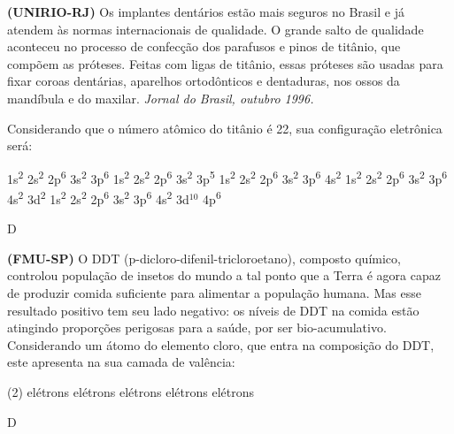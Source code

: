 \documentclass[9 pt]{scrartcl}
\def\PQ{0.84} %
\begin{document}
\begin{exercise}[points=\PQ]
\textbf{(UNIRIO-RJ)} Os implantes dentários estão mais seguros no Brasil e já atendem às normas internacionais de qualidade. O grande salto de qualidade aconteceu no processo de confecção dos parafusos e pinos de titânio, que compõem as próteses. Feitas com ligas de titânio, essas próteses são usadas para fixar coroas dentárias, aparelhos ortodônticos e dentaduras, nos ossos da mandíbula e do maxilar.
\emph{Jornal do Brasil, outubro 1996.}

Considerando que o número atômico do titânio é 22, sua configuração eletrônica será:

\begin{choice}
\choice 1s\textsuperscript{2} 2s\textsuperscript{2} 2p\textsuperscript{6} 3s\textsuperscript{2} 3p\textsuperscript{6}
\choice 1s\textsuperscript{2} 2s\textsuperscript{2} 2p\textsuperscript{6} 3s\textsuperscript{2} 3p\textsuperscript{5}
\choice 1s\textsuperscript{2} 2s\textsuperscript{2} 2p\textsuperscript{6} 3s\textsuperscript{2} 3p\textsuperscript{6} 4s\textsuperscript{2}
\choice 1s\textsuperscript{2} 2s\textsuperscript{2} 2p\textsuperscript{6} 3s\textsuperscript{2} 3p\textsuperscript{6} 4s\textsuperscript{2} 3d\textsuperscript{2}
\choice 1s\textsuperscript{2} 2s\textsuperscript{2} 2p\textsuperscript{6} 3s\textsuperscript{2} 3p\textsuperscript{6} 4s\textsuperscript{2} 3d$^{10}$ 4p\textsuperscript{6}
\end{choice}
\end{exercise}
\begin{solution}
D
\end{solution}

\begin{exercise}[points=\PQ]
\textbf{(FMU-SP)} O DDT (p-dicloro-difenil-tricloroetano), composto químico, controlou  população de insetos do mundo a tal ponto que a Terra é agora capaz de produzir comida suficiente para alimentar a população humana. Mas esse resultado positivo tem seu lado negativo: os níveis de DDT na comida estão atingindo proporções perigosas para a saúde, por ser bio-acumulativo.
Considerando um átomo do elemento cloro, que entra na composição do DDT, este apresenta na sua camada de valência:
\begin{choice}(2)
 elétrons
 elétrons
 elétrons
 elétrons
 elétrons
\end{choice}
\end{exercise}
\begin{solution}
D
\end{solution}
\end{document}
